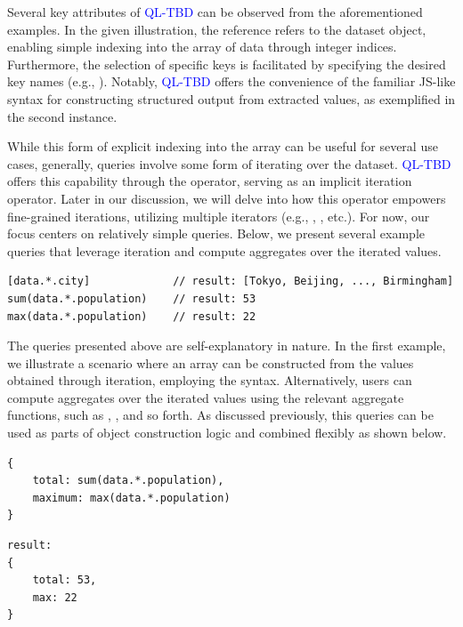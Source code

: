 \documentclass[runningheads]{llncs}
\newcommand{\lang}{\textcolor{blue}{QL-TBD}}
\begin{document}
Several key attributes of \lang{} can be observed from the aforementioned examples.
In the given illustration, the reference  refers to
the dataset object, enabling simple indexing into the array of data through integer
indices.
Furthermore, the selection of specific keys is facilitated by specifying the desired
key names (e.g., ).
Notably, \lang{} offers the convenience of the familiar JS-like syntax for constructing
structured output from extracted values, as exemplified in the second instance.

While this form of explicit indexing into the array can be useful for several
use cases, generally, queries involve some form of iterating over the dataset.
\lang{} offers this capability through the \inline{*} operator,
serving as an implicit iteration operator.
Later in our discussion, we will delve into how this operator empowers fine-grained
iterations, utilizing multiple iterators
(e.g., , , etc.).
For now, our focus centers on relatively simple queries.
Below, we present several example queries that leverage iteration and compute
aggregates over the iterated values.

\begin{lstlisting}[style=JavaScript, columns=flexible]
[data.*.city]             // result: [Tokyo, Beijing, ..., Birmingham]
sum(data.*.population)    // result: 53
max(data.*.population)    // result: 22
\end{lstlisting}

The queries presented above are self-explanatory in nature.
In the first example, we illustrate a scenario where an array can be constructed
from the values obtained through iteration, employing the \inline{[...]} syntax.
Alternatively, users can compute aggregates over the iterated values using the
relevant aggregate functions, such as , , and so forth.
As discussed previously, this queries can be used as parts of object
construction logic and combined flexibly as shown below.

\begin{minipage}{0.5\textwidth}
\begin{lstlisting}[style=JavaScript, columns=flexible, numbers=none]
{
    total: sum(data.*.population),
    maximum: max(data.*.population)
}
\end{lstlisting}
\end{minipage}

\begin{minipage}{0.5\textwidth}
\begin{lstlisting}[style=JSComment, columns=flexible, numbers=none]
result: 
{
    total: 53,
    max: 22
}
\end{lstlisting}
\end{minipage}
\end{document}
